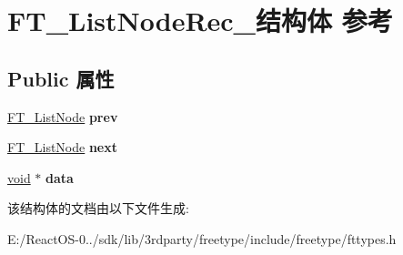 \hypertarget{struct_f_t___list_node_rec__}{}\section{F\+T\+\_\+\+List\+Node\+Rec\+\_\+结构体 参考}
\label{struct_f_t___list_node_rec__}
\subsection*{Public 属性}
\begin{DoxyCompactItemize}
\item 
\mbox{\label{struct_f_t___list_node_rec___a41c77950e6940b1b98e04709b705c046}} 
\hyperlink{struct_f_t___list_node_rec__}{F\+T\+\_\+\+List\+Node} {\bfseries prev}
\item 
\mbox{\label{struct_f_t___list_node_rec___a8275962fa8c92b77435cb4fa76251f39}} 
\hyperlink{struct_f_t___list_node_rec__}{F\+T\+\_\+\+List\+Node} {\bfseries next}
\item 
\mbox{\label{struct_f_t___list_node_rec___ab0202be88f722442a4bec9aeb5f6418f}} 
\hyperlink{interfacevoid}{void} $\ast$ {\bfseries data}
\end{DoxyCompactItemize}


该结构体的文档由以下文件生成\+:\begin{DoxyCompactItemize}
\item 
E\+:/\+React\+O\+S-\/0../sdk/lib/3rdparty/freetype/include/freetype/fttypes.\+h\end{DoxyCompactItemize}

